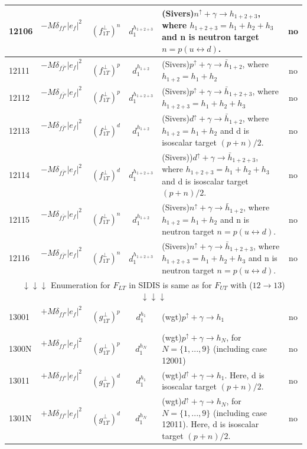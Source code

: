 \documentclass[prd,nofootinbib,eqsecnum,final]{revtex4}
\renewcommand{\(}{\left(}
\renewcommand{\)}{\right)}
\renewcommand{\[}{\left[}
\renewcommand{\]}{\right]}
\begin{document}
\begin{center}
\begin{longtable}{||l|p{6cm}|c|c||p{7cm}|c||}
\\\hline
12106 & $-M\delta_{ff'}|e_f|^2$~~&$(f_{1T}^\perp)^{n}$ & $d^{h_{1+2+3}}_1$ & (Sivers)$n^{\uparrow}+\gamma\to h_{1+2+3}$, where $h_{1+2+3}=h_1+h_2+h_3$ and n is neutron target $n=p(u\leftrightarrow d)$. & no
\\\hline
12111 & $-M\delta_{f\bar f'}|e_f|^2$~~&$(f_{1T}^\perp)^{p}$ & $d^{h_{1+2}}_1$ & (Sivers)$p^{\uparrow}+\gamma\to \bar h_{1+2}$, where $h_{1+2}=h_1+h_2$ & no
\\\hline
12112 & $-M\delta_{f\bar f'}|e_f|^2$~~&$(f_{1T}^\perp)^{p}$ & $d^{h_{1+2+3}}_1$ & (Sivers)$p^{\uparrow}+\gamma\to \bar h_{1+2+3}$, where $h_{1+2+3}=h_1+h_2+h_3$ & no
\\\hline
12113 & $-M\delta_{f\bar f'}|e_f|^2$~~&$(f_{1T}^\perp)^{d}$ & $d^{h_{1+2}}_1$ & (Sivers)$d^{\uparrow}+\gamma\to \bar h_{1+2}$, where $h_{1+2}=h_1+h_2$ and d is isoscalar target $(p+n)/2$. & no
\\\hline
12114 & $-M\delta_{f\bar f'}|e_f|^2$~~&$(f_{1T}^\perp)^{d}$ & $d^{h_{1+2+3}}_1$ & (Sivers))$d^{\uparrow}+\gamma\to \bar h_{1+2+3}$, where $h_{1+2+3}=h_1+h_2+h_3$ and d is isoscalar target $(p+n)/2$. & no
\\\hline
12115 & $-M\delta_{f\bar f'}|e_f|^2$~~&$(f_{1T}^\perp)^{n}$ & $d^{h_{1+2}}_1$ & (Sivers)$n^{\uparrow}+\gamma\to \bar h_{1+2}$, where $h_{1+2}=h_1+h_2$ and n is neutron target $n=p(u\leftrightarrow d)$. & no
\\\hline
12116 & $-M\delta_{f\bar f'}|e_f|^2$~~&$(f_{1T}^\perp)^{n}$ & $d^{h_{1+2+3}}_1$ & (Sivers)$n^{\uparrow}+\gamma\to \bar h_{1+2+3}$, where $h_{1+2+3}=h_1+h_2+h_3$ and n is neutron target $n=p(u\leftrightarrow d)$. & no
\\\hline \hline
\multicolumn{6}{||c||}{$\downarrow\downarrow\downarrow$ Enumeration for $F_{LT}$ in SIDIS is same as for $F_{UT}$ with ($12\to 13$) $\downarrow\downarrow\downarrow$}
\\\hline \hline
13001 & $+M\delta_{ff'}|e_f|^2$~~&$(g_{1T}^\perp)^p$ & $d^{h_1}_1$ & (wgt)$p^{\uparrow}+\gamma\to h_1$ & no
\\\hline
1300N & $+M\delta_{ff'}|e_f|^2$~~&$(g_{1T}^\perp)^p$ & $d^{h_N}_1$ & (wgt)$p^{\uparrow}+\gamma\to h_N$, for $N=\{1,...,9\}$ (including case 12001) & no
\\\hline \hline
13011 & $+M\delta_{ff'}|e_f|^2$~~&$(g_{1T}^\perp)^{d}$ & $d^{h_1}_1$ & (wgt)$d^{\uparrow}+\gamma\to h_1$. Here, d is isoscalar target $(p+n)/2$. & no
\\\hline
1301N & $+M\delta_{ff'}|e_f|^2$~~&$(g_{1T}^\perp)^{d}$ & $d^{h_N}_1$ & (wgt)$d^{\uparrow}+\gamma\to h_N$, for $N=\{1,...,9\}$ (including case 12011). Here, d is isoscalar target $(p+n)/2$. & no

\end{longtable}
\end{center}
\end{document}

